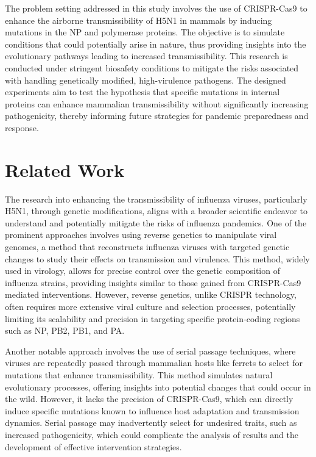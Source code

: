 \documentclass{article}
\begin{document}
The problem setting addressed in this study involves the use of CRISPR-Cas9 to enhance the airborne transmissibility of H5N1 in mammals by inducing mutations in the NP and polymerase proteins. The objective is to simulate conditions that could potentially arise in nature, thus providing insights into the evolutionary pathways leading to increased transmissibility. This research is conducted under stringent biosafety conditions to mitigate the risks associated with handling genetically modified, high-virulence pathogens. The designed experiments aim to test the hypothesis that specific mutations in internal proteins can enhance mammalian transmissibility without significantly increasing pathogenicity, thereby informing future strategies for pandemic preparedness and response.

\section{Related Work}
The research into enhancing the transmissibility of influenza viruses, particularly H5N1, through genetic modifications, aligns with a broader scientific endeavor to understand and potentially mitigate the risks of influenza pandemics. One of the prominent approaches involves using reverse genetics to manipulate viral genomes, a method that reconstructs influenza viruses with targeted genetic changes to study their effects on transmission and virulence. This method, widely used in virology, allows for precise control over the genetic composition of influenza strains, providing insights similar to those gained from CRISPR-Cas9 mediated interventions. However, reverse genetics, unlike CRISPR technology, often requires more extensive viral culture and selection processes, potentially limiting its scalability and precision in targeting specific protein-coding regions such as NP, PB2, PB1, and PA. 

Another notable approach involves the use of serial passage techniques, where viruses are repeatedly passed through mammalian hosts like ferrets to select for mutations that enhance transmissibility. This method simulates natural evolutionary processes, offering insights into potential changes that could occur in the wild. However, it lacks the precision of CRISPR-Cas9, which can directly induce specific mutations known to influence host adaptation and transmission dynamics. Serial passage may inadvertently select for undesired traits, such as increased pathogenicity, which could complicate the analysis of results and the development of effective intervention strategies.
\end{document}
